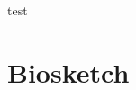 \documentclass[11pt]{report}
\begin{document}
\thispagestyle{empty}  %

\newpage

\tableofcontents
\newpage

%
%
%


% 


\newpage
test
%

%

\section{Biosketch}

\newpage

% 
%


%
\end{document}
